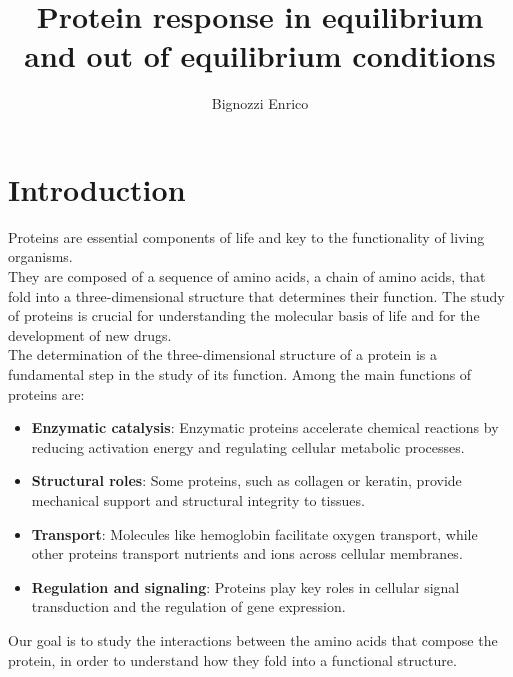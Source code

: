 \documentclass[English, Lau, oneside]{sapthesis}
\title{Protein response in equilibrium and out of equilibrium conditions}
\author{Bignozzi Enrico}
\begin{document}
\maketitle

\tableofcontents



    

\dedication{}

\newpage
\null
\thispagestyle{empty}
\newpage




\newpage
\null
\thispagestyle{empty}
\newpage



\chapter*{Introduction}
\noindent
Proteins are essential components of life and key to the functionality of living organisms. \cite{ref} \\
They are composed of a sequence of amino acids, a chain of amino acids, that fold into a three-dimensional structure that determines their function. 
The study of proteins is crucial for understanding the molecular basis of life and for the development of new drugs.\\
The determination of the three-dimensional structure of a protein is a fundamental step in the study of its function.
Among the main functions of proteins are:\cite{ref}
\begin{itemize}
    \item \textbf{Enzymatic catalysis}: Enzymatic proteins accelerate chemical reactions by reducing activation energy and regulating cellular metabolic processes.
    \item \textbf{Structural roles}: Some proteins, such as collagen or keratin, provide mechanical support and structural integrity to tissues.
    \item \textbf{Transport}: Molecules like hemoglobin facilitate oxygen transport, while other proteins transport nutrients and ions across cellular membranes.
    \item \textbf{Regulation and signaling}: Proteins play key roles in cellular signal transduction and the regulation of gene expression.
\end{itemize}
Our goal is to study the interactions between the amino acids that compose the protein, 
in order to understand how they fold into a functional structure.
\end{document}
